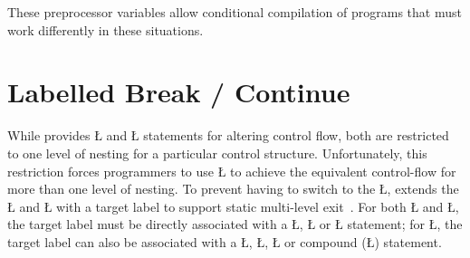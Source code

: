 \documentclass[openright,twoside]{report}
\begin{document}
These preprocessor variables allow conditional compilation of programs that must work differently in these situations.


\section{Labelled Break / Continue}
\label{s:LabelledBreakContinue}

While \CC provides \LGinlinetrue\LGbegin\lgrinde\L{}\endlgrinde\LGend{} and \LGinlinetrue\LGbegin\lgrinde\L{}\endlgrinde\LGend{} statements for altering control flow, both are restricted to one level of nesting for a particular control structure.
Unfortunately, this restriction forces programmers to use \LGinlinetrue\LGbegin\lgrinde\L{}\endlgrinde\LGend{} to achieve the equivalent control-flow for more than one level of nesting.
To prevent having to switch to the \LGinlinetrue\LGbegin\lgrinde\L{}\endlgrinde\LGend{}, \uC extends the \LGinlinetrue\LGbegin\lgrinde\L{}\endlgrinde\LGend{} and \LGinlinetrue\LGbegin\lgrinde\L{}\endlgrinde\LGend{} with a target label to support static multi-level exit~\cite{Buhr85,Java}.
For both \LGinlinetrue\LGbegin\lgrinde\L{}\endlgrinde\LGend{} and \LGinlinetrue\LGbegin\lgrinde\L{}\endlgrinde\LGend{}, the target label must be directly associated with a \LGinlinetrue\LGbegin\lgrinde\L{}\endlgrinde\LGend{}, \LGinlinetrue\LGbegin\lgrinde\L{}\endlgrinde\LGend{} or \LGinlinetrue\LGbegin\lgrinde\L{}\endlgrinde\LGend{} statement;
for \LGinlinetrue\LGbegin\lgrinde\L{}\endlgrinde\LGend{}, the target label can also be associated with a \LGinlinetrue\LGbegin\lgrinde\L{}\endlgrinde\LGend{}, \LGinlinetrue\LGbegin\lgrinde\L{}\endlgrinde\LGend{}, \LGinlinetrue\LGbegin\lgrinde\L{}\endlgrinde\LGend{} or compound (\LGinlinetrue\LGbegin\lgrinde\L{\LB{\{\,\}}}\endlgrinde\LGend{}) statement.
\end{document}
